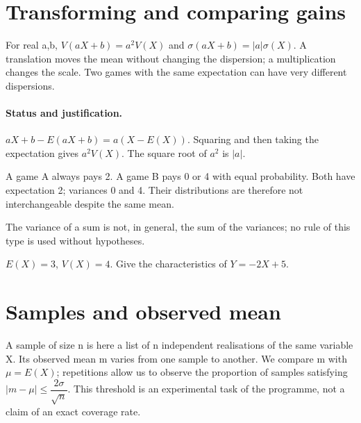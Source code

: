 \section{Transforming and comparing gains}\label{C08-U4}
\begin{keypoint}
For real a,b, $V(aX+b)=a^2V(X)$ and $\sigma(aX+b)=|a|\sigma(X)$. A translation moves the mean without changing the dispersion; a multiplication changes the scale. Two games with the same expectation can have very different dispersions.
\end{keypoint}
\paragraph{Status and justification.} $aX+b-E(aX+b)=a(X-E(X))$. Squaring and then taking the expectation gives $a^2V(X)$. The square root of $a^2$ is $|a|$.
\begin{example}A game A always pays 2. A game B pays 0 or 4 with equal probability. Both have expectation 2; variances 0 and 4. Their distributions are therefore not interchangeable despite the same mean.\end{example}\label{C08-EX4}
\begin{pitfall}The variance of a sum is not, in general, the sum of the variances; no rule of this type is used without hypotheses.\end{pitfall}
\begin{application}$E(X)=3$, $V(X)=4$. Give the characteristics of $Y=-2X+5$.\end{application}\label{C08-AP4}
\section{Samples and observed mean}\label{C08-U5}
\begin{keypoint}
A sample of size n is here a list of n independent realisations of the same variable X. Its observed mean m varies from one sample to another. We compare m with $\mu=E(X)$; repetitions allow us to observe the proportion of samples satisfying $|m-\mu|\leq \dfrac{2\sigma}{\sqrt n}$. This threshold is an experimental task of the programme, not a claim of an exact coverage rate.
\end{keypoint}
